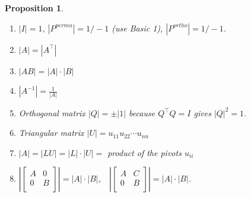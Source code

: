 \documentclass[14pt]{article}
\newtheorem{proposition}[theorem]{Proposition}
\theoremstyle{definition}
\theoremstyle{remark}
\begin{document}
\begin{multicols}{2}
    \begin{proposition}
        \begin{enumerate}
            \item $|I| = 1$, $|P^{permu}| = 1/-1$ (use Basic 1), $|P^{ortho}| = 1/-1$.
            \item $|A| = |A^\top|$
            \item $|AB| = |A|\cdot|B|$
            \item $|A^{-1}| = \frac{1}{|A|}$
            \item Orthogonal matrix $|Q|= \pm |1|$ because $Q^\top Q=I$ gives $|Q|^2=1$.
            \item Triangular matrix $|U|=u_{11} u_{22} \cdots u_{n n}$
            \item
                  $|A| = |L U|=|L|\cdot |U|=$ product of the pivots $u_{i i}$
            \item $\left|\begin{bmatrix}
                          A & 0 \\
                          0 & B \\
                      \end{bmatrix}\right| = |A|\cdot |B|$,$ \quad \left|\begin{bmatrix}
                          A & C \\
                          0 & B \\
                      \end{bmatrix}\right| = |A|\cdot |B|$.
        \end{enumerate}
    \end{proposition}
\end{multicols}

\headrule
\end{document}
